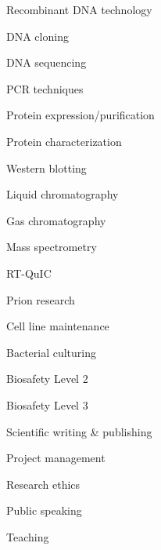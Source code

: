 \documentclass{resume}
\begin{document}
        \begin{skills}
            \item Recombinant DNA technology
            \item DNA cloning
            \item DNA sequencing
            \item PCR techniques
            \item Protein expression/purification
            \item Protein characterization
            \item Western blotting
            \item Liquid chromatography
            \item Gas chromatography
            \item Mass spectrometry
            \item RT-QuIC
            \item Prion research
            \item Cell line maintenance
            \item Bacterial culturing
            \item Biosafety Level 2
            \item Biosafety Level 3
        \end{skills}

        \begin{skills}
            \item Scientific writing \& publishing
            \item Project management
            \item Research ethics
            \item Public speaking
            \item Teaching
        \end{skills}


\end{document}
